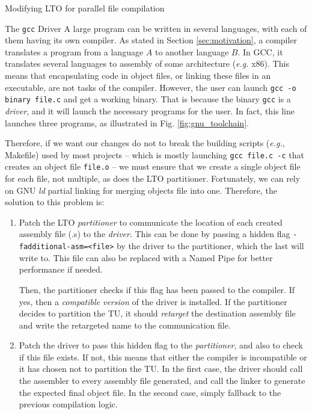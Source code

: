 \begin{section}{Modifying LTO for parallel file compilation}
\begin{subsection}{The \texttt{gcc} Driver}
A large program can be written in several languages, with each of them having
its own compiler. As stated in Section \ref{sec:motivation}, a compiler
translates a program from a language $A$ to another language $B$.
In GCC, it translates several languages to assembly
of some architecture (\textit{e.g.} x86). This means that
encapsulating code in object files, or linking these files in an executable, are
not tasks of the compiler. However, the user can launch \texttt{gcc -o binary
file.c} and get a working binary. That is because the binary \texttt{gcc} is
a \textit{driver}, and it will launch the
necessary programs for the user. In fact, this line launches three programs,
as illustrated in Fig. \ref{fig:gnu_toolchain}.

Therefore, if we want our changes do not to break the building scripts
(\textit{e.g.}, Makefile) used by most projects -- which is mostly launching
\texttt{gcc file.c -c} that creates an object file \texttt{file.o} -- we must
ensure that we create a single object file for each file, not multiple, as does
the LTO partitioner. Fortunately, we can rely on GNU \textit{ld} partial linking
for merging objects file into one. Therefore, the solution to this problem is:
\begin{enumerate}
	\item Patch the LTO \textit{partitioner} to communicate the location of
	each created assembly file (.s) to the \textit{driver}. This can be
	done by passing a hidden flag \texttt{-fadditional-asm=<file>}
	by the driver to the partitioner, which the last will write to. This file can also
	be replaced with a Named Pipe for better performance if needed.

	Then, the partitioner checks if this flag has been passed to the compiler.
	If yes, then a \textit{compatible version} of the driver is installed. If
	the partitioner decides to partition the TU, it should \textit{retarget}
	the destination assembly file and write the retargeted name to the
	communication file.

	\item Patch the driver to pass this hidden flag to the
	\textit{partitioner}, and also to check if this file exists. If not, this means
	that either the compiler is incompatible or it has chosen not to partition
	the TU. In the first case, the driver should call the assembler to every
	assembly file generated, and call the linker to generate the expected
	final object file. In the second case, simply fallback to the previous
	compilation logic.
\end{enumerate}


\end{subsection}
\end{section}
